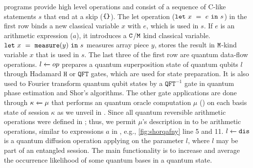 \qafny programs provide high level operations and consist of a sequence of C-like statements $s$ that end at a skip ($\texttt{\{\}}$).
The let operation ($\texttt{let}~{x}~=~{e}~\texttt{in}~{s}$) in the first row binds a new classical variable $x$ with $e$, which is used in $s$. If $e$ is an arithmetic expression ($a$), it introduces a $\texttt{C}$/$\texttt{M}$ kind classical variable.
$\texttt{let}~{x}~=~{\texttt{measure}(y)}~\texttt{in}~{s}$ measures array piece $y$, stores the result in $\texttt{M}$-kind variable $x$ that is used in $s$.
The last three of the first row are quantum data-flow operations.
${l} \xleftarrow{} {op}$ prepares a quantum superposition state of quantum qubits $l$ through Hadamard $\texttt{H}$ or $\texttt{QFT}$ gates, which are used for state preparation. It is also used to Fourier transform quantum qubit states by a $\texttt{QFT}^{-1}$ gate in quantum phase estimation and Shor's algorithms.
The other gate applications are done through ${\kappa} \xleftarrow{} {\mu}$ that performs an \oqasm quantum oracle computation $\mu$ (\cite{oracleoopsla}) on each basis state of session $\kappa$ as we unveil in . Since all quantum reversible arithmetic operations were defined in \oqasm; thus, we permit $\mu$'s description in \qafny to be arithmetic operations, similar to expressions $a$ in , e.g., \cref{fig:shorqafny} line 5 and 11.
${l} \xleftarrow{} {\texttt{dis}}$ is a quantum diffusion operation applying on the parameter $l$, where $l$ may be part of an entangled session.
The main functionality is to increase and average the occurrence likelihood of some quantum bases in a quantum state.

